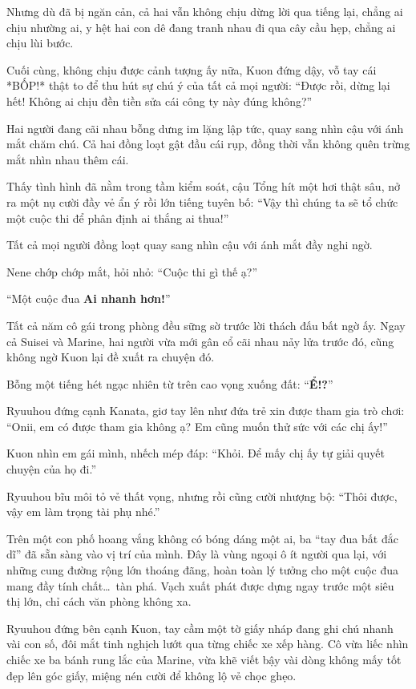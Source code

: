 \documentclass[../main.tex]{subfiles}
\begin{document}
Nhưng dù đã bị ngăn cản, cả hai vẫn không chịu dừng lời qua tiếng lại, chẳng ai chịu nhường ai, y hệt hai con dê đang tranh nhau đi qua cây cầu hẹp, chẳng ai chịu lùi bước.

Cuối cùng, không chịu được cảnh tượng ấy nữa, Kuon đứng dậy, vỗ tay cái *BỐP!* thật to để thu hút sự chú ý của tất cả mọi người: ``Được rồi, dừng lại hết! Không ai chịu đền tiền sửa cái công ty này đúng không?''

Hai người đang cãi nhau bỗng dưng im lặng lập tức, quay sang nhìn cậu với ánh mắt chăm chú. Cả hai đồng loạt gật đầu cái rụp, đồng thời vẫn không quên trừng mắt nhìn nhau thêm cái.

Thấy tình hình đã nằm trong tầm kiểm soát, cậu Tổng hít một hơi thật sâu, nở ra một nụ cười đầy vẻ ẩn ý rồi lớn tiếng tuyên bố: ``Vậy thì chúng ta sẽ tổ chức một cuộc thi để phân định ai thắng ai thua!''

Tất cả mọi người đồng loạt quay sang nhìn cậu với ánh mắt đầy nghi ngờ.

Nene chớp chớp mắt, hỏi nhỏ: ``Cuộc thi gì thế ạ?''

``Một cuộc đua \textbf{Ai nhanh hơn!}''

Tất cả năm cô gái trong phòng đều sững sờ trước lời thách đấu bất ngờ ấy. Ngay cả Suisei và Marine, hai người vừa mới gân cổ cãi nhau nảy lửa trước đó, cũng không ngờ Kuon lại đề xuất ra chuyện đó.

Bỗng một tiếng hét ngạc nhiên từ trên cao vọng xuống đất: ``\textbf{Ể!?}''

Ryuuhou đứng cạnh Kanata, giơ tay lên như đứa trẻ xin được tham gia trò chơi: ``Onii, em có được tham gia không ạ? Em cũng muốn thử sức với các chị ấy!''

Kuon nhìn em gái mình, nhếch mép đáp: ``Khỏi. Để mấy chị ấy tự giải quyết chuyện của họ đi.''

Ryuuhou bĩu môi tỏ vẻ thất vọng, nhưng rồi cũng cười nhượng bộ: ``Thôi được, vậy em làm trọng tài phụ nhé.''

\ct

Trên một con phố hoang vắng không có bóng dáng một ai, ba ``tay đua bất đắc dĩ'' đã sẵn sàng vào vị trí của mình. Đây là vùng ngoại ô ít người qua lại, với những cung đường rộng lớn thoáng đãng, hoàn toàn lý tưởng cho một cuộc đua mang đầy tính chất\dots\ tàn phá. Vạch xuất phát được dựng ngay trước một siêu thị lớn, chỉ cách văn phòng không xa.

Ryuuhou đứng bên cạnh Kuon, tay cầm một tờ giấy nháp đang ghi chú nhanh vài con số, đôi mắt tinh nghịch lướt qua từng chiếc xe xếp hàng. Cô vừa liếc nhìn chiếc xe ba bánh rung lắc của Marine, vừa khẽ viết bậy vài dòng không mấy tốt đẹp lên góc giấy, miệng nén cười để không lộ vẻ chọc ghẹo.
\end{document}
